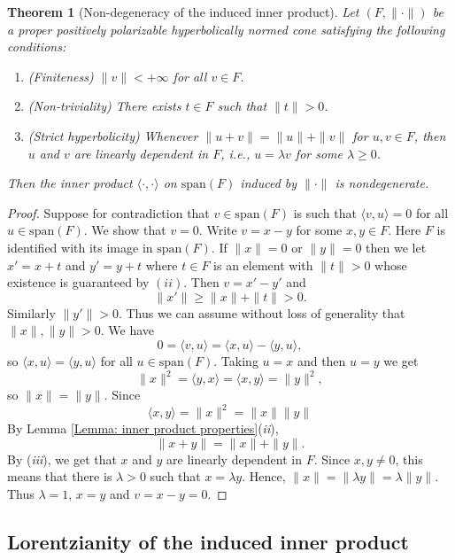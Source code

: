 \documentclass[a4paper,11pt]{article}
\numberwithin{equation}{section}
\theoremstyle{definition}
\theoremstyle{plain}
\newtheorem{Theorem}[Definition]{Theorem}
\newcommand{\spn}{\mathrm{span}}
\newcommand{\inner}[2]{\langle #1, #2 \rangle}
\newcommand{\norm}[1]{\| #1\|}
\begin{document}
\begin{Theorem}[Non-degeneracy of the induced inner product]\label{Theorem: innerproductnondegenerate}
Let $(F,\|\cdot\|)$ be a proper positively polarizable hyperbolically normed cone satisfying the following conditions:
\begin{enumerate}
    \item[(i)] (Finiteness) $\|v\| < +\infty$ for all $v \in F$.
    \item[(ii)] (Non-triviality) There exists $t \in F$ such that $\|t\| > 0$.
    \item[(iii)] (Strict hyperbolicity) Whenever $\|u + v \| = \|u \| + \|v\|$ for $u,v \in F$, then $u$ and $v$ are linearly dependent in $F$, i.e., $u = \lambda v$ for some $\lambda \geq 0$.
\end{enumerate}
Then the inner product $\inner{\cdot}{\cdot}$ on $\spn(F)$ induced by $\norm{\cdot}$ is nondegenerate.
\end{Theorem}
\begin{proof}
    Suppose for contradiction that $v \in \spn(F)$ is such that $\inner{v}{u} = 0$ for all $u \in \spn(F)$. We show that $v = 0$.	Write $v = x - y$ for some $x, y \in F$. Here $F$ is identified with its image in $\spn(F)$. If $\norm{x} = 0$ or $\norm{y} = 0$ then we let $x' = x + t$ and $y' = y + t$ where $t \in F$ is an element with $\norm{t} > 0$ whose existence is guaranteed by $(ii)$. Then $v = x' - y'$ and 
    $$\norm{x'} \geq \norm{x} + \norm{t} > 0.$$
    Similarly $\norm{y'} > 0$. Thus we can assume without loss of generality that $\norm{x}, \norm{y} > 0$. We have
    $$0 = \inner{v}{u} = \inner{x}{u} - \inner{y}{u},$$
    so $\inner{x}{u} = \inner{y}{u}$ for all $u \in \spn(F)$. Taking $u = x$ and then $u = y$ we get
    $$\norm{x}^{2} = \inner{y}{x} = \inner{x}{y} = \norm{y}^{2},$$
    so $\norm{x} = \norm{y}$. Since
    $$\inner{x}{y} = \norm{x}^{2} = \norm{x}\norm{y}$$
    By Lemma \ref{Lemma: inner product properties}(\textit{ii}),
    $$\norm{x + y} = \norm{x} + \norm{y}.$$
    By (\textit{iii}), we get that $x$ and $y$ are linearly dependent in $F$. Since $x,y \neq 0$, this means that there is $\lambda > 0$ such that $x = \lambda y$. Hence, $\norm{x} = \norm{\lambda y} = \lambda \norm{y}$. Thus $\lambda = 1$, $x = y$ and $v = x - y = 0$.
\end{proof}

\subsection{Lorentzianity of the induced inner product}\label{Subsection: Lorentzianityofinnerproduct}
\end{document}
